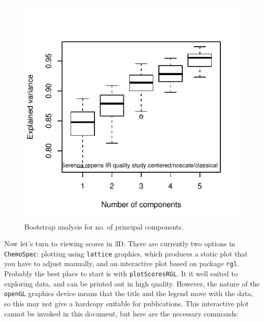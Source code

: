 \documentclass[letter,10pt,twocolumn,twoside,printwatermark=false]{pinp}
\begin{document}
\begin{figure}

{\centering \includegraphics{ChemoSpec2_files/figure-latex/Chunk25-1} 

}

\caption{\label{boot}Bootstrap analysis for no. of principal components.}\label{fig:Chunk25}
\end{figure}

Now let's turn to viewing scores in 3D. There are currently two options
in \texttt{ChemoSpec}: plotting using \texttt{lattice} graphics, which
produces a static plot that you have to adjust manually, and an
interactive plot based on package \texttt{rgl}. Probably the best place
to start is with \texttt{plotScoresRGL}. It it well suited to exploring
data, and can be printed out in high quality. However, the nature of the
\texttt{openGL} graphics device means that the title and the legend move
with the data, so this may not give a hardcopy suitable for
publications. This interactive plot cannot be invoked in this document,
but here are the necessary commands:

\begin{Shaded}
\begin{Highlighting}[]
   \NormalTok{,}
   \NormalTok{,}
   \NormalTok{) }
\end{Highlighting}
\end{Shaded}
\end{document}

